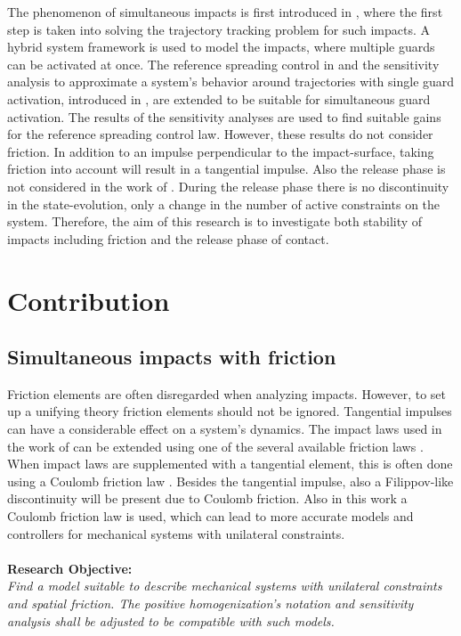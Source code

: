 \documentclass[../DC2017114Bouma.tex]{subfiles}
\begin{document}
The phenomenon of simultaneous impacts is first introduced in \cite{Chen2018a}, where the first step is taken into solving the trajectory tracking problem for such impacts. A hybrid system framework is used to model the impacts, where multiple guards can be activated at once. The reference spreading control in \cite{Rijnen2016,Rijnen2017} and the sensitivity analysis to approximate a system's behavior around trajectories with single guard activation, introduced in \cite{Saccon2014}, are extended to be suitable for simultaneous guard activation. The results of the sensitivity analyses are used to find suitable gains for the reference spreading control law. However, these results do not consider friction. In addition to an impulse perpendicular to the impact-surface, taking friction into account will result in a tangential impulse. Also the release phase is not considered in the work of \cite{Chen2018a}. During the release phase there is no discontinuity in the state-evolution, only a change in the number of active constraints on the system. Therefore, the aim of this research is to investigate both stability of impacts including friction and the release phase of contact.

\section{Contribution}

\subsection*{Simultaneous impacts with friction}
Friction elements are often disregarded when analyzing impacts. However, to set up a unifying theory friction elements should not be ignored. Tangential impulses can have a considerable effect on a system's dynamics. The impact laws used in the work of \cite{Chen2018a} can be extended using one of the several available friction laws \cite{Leine2008}. When impact laws are supplemented with a tangential element, this is often done using a Coulomb friction law \cite{Glocker2014a}. Besides the tangential impulse, also a Filippov-like discontinuity will be present due to Coulomb friction. Also in this work a Coulomb friction law is used, which can lead to more accurate models and controllers for mechanical systems with unilateral constraints.\\\\
\textbf{Research Objective:}\\
\textit{Find a model suitable to describe mechanical systems with unilateral constraints and spatial friction. The positive homogenization's notation and sensitivity analysis shall be adjusted to be compatible with such models.}
\end{document}
